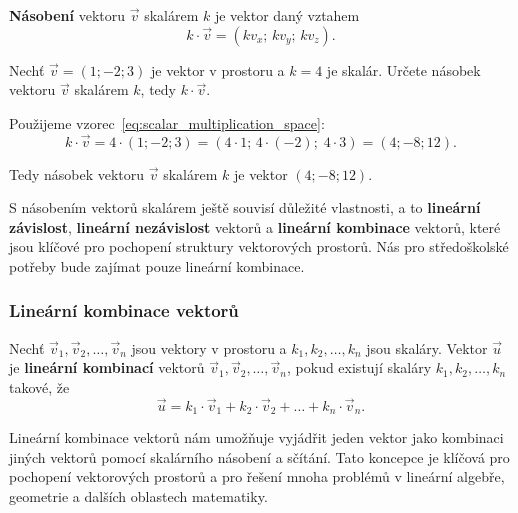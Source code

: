 \begin{definition}\label{def:scalar_multiplication_space}
    \textbf{Násobení} vektoru $\vec{v}$ skalárem $k$ je vektor daný vztahem
    \begin{equation}\label{eq:scalar_multiplication_space}
        k \cdot \vec{v} = (k v_x;\, k v_y;\, k v_z).
    \end{equation}
\end{definition}

\begin{example}\label{exa:linear_combination_space}
    Nechť $\vec{v} = (1; -2; 3)$ je vektor v prostoru a $k = 4$ je skalár. Určete násobek vektoru $\vec{v}$ skalárem $k$, tedy $k \cdot \vec{v}$.

    Použijeme vzorec~\eqref{eq:scalar_multiplication_space}:
    \[
    k \cdot \vec{v} = 4 \cdot (1; -2; 3) = (4 \cdot 1;\, 4 \cdot (-2);\; 4 \cdot 3) = (4; -8; 12).
    \]

    Tedy násobek vektoru $\vec{v}$ skalárem $k$ je vektor $(4; -8; 12)$.
\end{example}

S násobením vektorů skalárem ještě souvisí důležité vlastnosti, a to \textbf{lineární závislost}, 
\textbf{lineární nezávislost} vektorů a \textbf{lineární kombinace} vektorů, 
které jsou klíčové pro pochopení struktury vektorových prostorů. Nás pro středoškolské potřeby bude zajímat pouze lineární kombinace.

\subsubsection{Lineární kombinace vektorů}\label{subsubsec:Linear_combination_in_space}

\begin{definition}\label{def:linear_combination_space}
    Nechť $\vec{v}_1, \vec{v}_2, \ldots, \vec{v}_n$ jsou vektory v prostoru a $k_1, k_2, \ldots, k_n$ jsou skaláry. 
    Vektor $\vec{u}$ je \textbf{lineární kombinací} vektorů $\vec{v}_1, \vec{v}_2, \ldots, \vec{v}_n$, 
    pokud existují skaláry $k_1, k_2, \ldots, k_n$ takové, že
    \begin{equation}\label{eq:linear_combination_space}
        \vec{u} = k_1 \cdot \vec{v}_1 + k_2 \cdot \vec{v}_2 + \ldots + k_n \cdot \vec{v}_n.
    \end{equation}
\end{definition}
Lineární kombinace vektorů nám umožňuje vyjádřit jeden vektor jako kombinaci jiných vektorů pomocí skalárního násobení a sčítání.
Tato koncepce je klíčová pro pochopení vektorových prostorů a pro řešení mnoha problémů v lineární algebře, geometrie a dalších oblastech matematiky.

